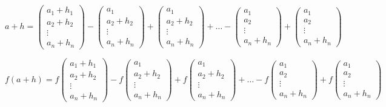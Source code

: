 \documentclass[11pt]{article}
\begin{document}
\[
a + h = \begin{pmatrix}
    a_1 + h_1 \\
    a_2 + h_2 \\
    \vdots \\
    a_n + h_n
\end{pmatrix} - \begin{pmatrix}
    a_1 \\
    a_2 + h_2\\
    \vdots \\
    a_n + h_n
\end{pmatrix} + \begin{pmatrix}
    a_1 \\
    a_2 + h_2 \\
    \vdots \\
    a_n + h_n
\end{pmatrix} + \ldots - \begin{pmatrix}
    a_1 \\
    a_2 \\
    \vdots \\
    a_n + h_n
\end{pmatrix} + \begin{pmatrix}
    a_1 \\
    a_2 \\
    \vdots \\
    a_n + h_n
\end{pmatrix}
\]

\[
f(a + h) = f\begin{pmatrix}
    a_1 + h_1 \\
    a_2 + h_2 \\
    \vdots \\
    a_n + h_n
\end{pmatrix} - f\begin{pmatrix}
    a_1 \\
    a_2 + h_2\\
    \vdots \\
    a_n + h_n
\end{pmatrix} + f\begin{pmatrix}
    a_1 \\
    a_2 + h_2 \\
    \vdots \\
    a_n + h_n
\end{pmatrix} + \ldots - f\begin{pmatrix}
    a_1 \\
    a_2 \\
    \vdots \\
    a_n + h_n
\end{pmatrix} + f\begin{pmatrix}
    a_1 \\
    a_2 \\
    \vdots \\
    a_n + h_n
\end{pmatrix}
\]
\end{document}
